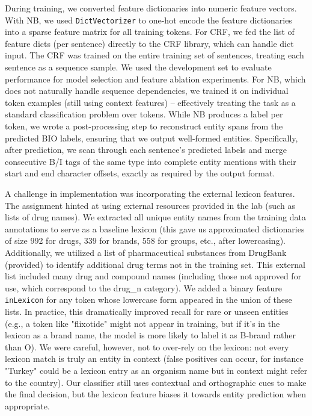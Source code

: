 During training, we converted feature dictionaries into numeric feature vectors. With NB, we used \texttt{DictVectorizer} to one-hot encode the feature dictionaries into a sparse feature matrix for all training tokens. For CRF, we fed the list of feature dicts (per sentence) directly to the CRF library, which can handle dict input. The CRF was trained on the entire training set of sentences, treating each sentence as a sequence sample. We used the development set to evaluate performance for model selection and feature ablation experiments. For NB, which does not naturally handle sequence dependencies, we trained it on individual token examples (still using context features) – effectively treating the task as a standard classification problem over tokens. While NB produces a label per token, we wrote a post-processing step to reconstruct entity spans from the predicted BIO labels, ensuring that we output well-formed entities. Specifically, after prediction, we scan through each sentence's predicted labels and merge consecutive B/I tags of the same type into complete entity mentions with their start and end character offsets, exactly as required by the output format.

A challenge in implementation was incorporating the external lexicon features. The assignment hinted at using external resources provided in the lab (such as lists of drug names). We extracted all unique entity names from the training data annotations to serve as a baseline lexicon (this gave us approximated dictionaries of size 992 for drugs, 339 for brands, 558 for groups, etc., after lowercasing). Additionally, we utilized a list of pharmaceutical substances from DrugBank (provided) to identify additional drug terms not in the training set. This external list included many drug and compound names (including those not approved for use, which correspond to the drug\_n category). We added a binary feature \texttt{inLexicon} for any token whose lowercase form appeared in the union of these lists. In practice, this dramatically improved recall for rare or unseen entities (e.g., a token like "flixotide" might not appear in training, but if it's in the lexicon as a brand name, the model is more likely to label it as B-brand rather than O). We were careful, however, not to over-rely on the lexicon: not every lexicon match is truly an entity in context (false positives can occur, for instance "Turkey" could be a lexicon entry as an organism name but in context might refer to the country). Our classifier still uses contextual and orthographic cues to make the final decision, but the lexicon feature biases it towards entity prediction when appropriate.

